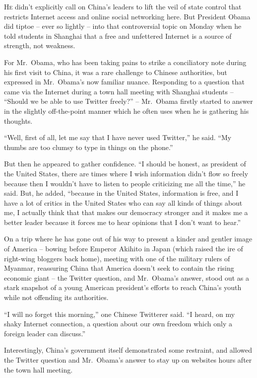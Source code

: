 ﻿\documentclass[12pt]{article}
\begin{document}
\lettrine{H}{e} didn't explicitly call on China's leaders to lift the veil
of state control that restricts Internet access and online social networking here. But President
Obama did tiptoe -- ever so lightly -- into that controversial topic on Monday when he told students
in Shanghai that a free and unfettered Internet is a source of strength, not weakness.

For Mr.~Obama, who has been taking pains to strike a conciliatory note during his first visit to
China, it was a rare challenge to Chinese authorities, but expressed in Mr.~Obama's now familiar
nuance. Responding to a question that came via the Internet during a town hall meeting with Shanghai
students -- ``Should we be able to use Twitter freely?'' -- Mr.~Obama firstly started to answer in
the slightly off-the-point manner which he often uses when he is gathering his thoughts.

``Well, first of all, let me say that I have never used Twitter,'' he said. ``My thumbs are too
clumsy to type in things on the phone.''

But then he appeared to gather confidence. ``I should be honest, as president of the United States,
there are times where I wish information didn't flow so freely because then I wouldn't have to
listen to people criticizing me all the time,'' he said. But, he added, ``because in the United
States, information is free, and I have a lot of critics in the United States who can say all kinds
of things about me, I actually think that that makes our democracy stronger and it makes me a better
leader because it forces me to hear opinions that I don't want to hear.''

On a trip where he has gone out of his way to present a kinder and gentler image of America --
bowing before Emperor Akihito in Japan (which raised the ire of right-wing bloggers back home),
meeting with one of the military rulers of Myanmar, reassuring China that America doesn't seek to
contain the rising economic giant -- the Twitter question, and Mr.~Obama's answer, stood out as a
stark snapshot of a young American president's efforts to reach China's youth while not offending
its authorities.

``I will no forget this morning,'' one Chinese Twitterer said. ``I heard, on my shaky Internet
connection, a question about our own freedom which only a foreign leader can discuss.''

Interestingly, China's government itself demonstrated some restraint, and allowed the Twitter
question and Mr.~Obama's answer to stay up on websites hours after the town hall meeting.
\end{document}
